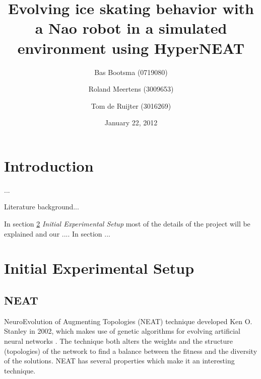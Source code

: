 \documentclass[a4paper,10pt]{article}
\begin{document}
\title{Evolving ice skating behavior with a Nao robot in a simulated environment using HyperNEAT}

\author{Bas Bootsma (0719080) \and Roland Meertens (3009653) \and Tom de Ruijter (3016269)}

\date{January 22, 2012}

\maketitle

\section{Introduction}
...

Literature background...

In section \ref{sec:initial-experimental-setup} \emph{Initial Experimental Setup} most of the details of the project will be explained and our .... In section ...

\section{Initial Experimental Setup}
\label{sec:initial-experimental-setup}


\subsection{NEAT}
NeuroEvolution of Augmenting Topologies (NEAT) technique developed Ken O. Stanley in 2002, which makes use of genetic algorithms for evolving artificial neural networks \cite{wikipedia:neat}. The technique both alters the weights and the structure (topologies) of the network to find a balance between the fitness and the diversity of the solutions. NEAT has several properties which make it an interesting technique.
\end{document}
